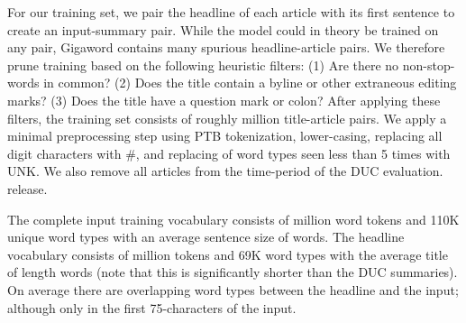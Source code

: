 \documentclass[11pt,a4paper]{article}
\begin{document}
For our training set, we pair the headline of each article with its
first sentence to create an input-summary pair. While the model could
in theory be trained on any pair, Gigaword contains many spurious
headline-article pairs.  We therefore prune training based on the following
heuristic filters: (1) Are there no non-stop-words in common? (2)
Does the title contain a byline or other extraneous editing marks? (3)
Does the title have a question mark or colon? After applying these
filters, the training set consists of roughly  million
title-article pairs. We apply a minimal preprocessing step using 
PTB tokenization, lower-casing, replacing all digit characters with
\#, and replacing of word types seen less than 5 times with UNK.  We
also remove all articles from the time-period of the DUC evaluation. 
release.
 


The complete input training vocabulary consists of  million
word tokens and 110K unique word types with an average sentence size of
 words.  The headline vocabulary consists of  million tokens
and 69K word types with the average title of length  words (note that this is significantly shorter than the DUC summaries). On average
there are  overlapping word types between the headline and the
input; although only  in the first 75-characters of the input. 
\end{document}
